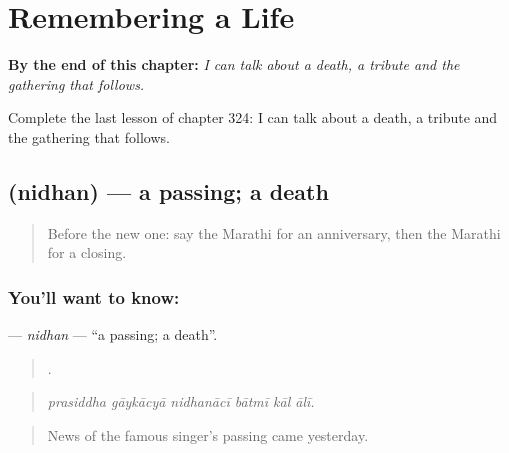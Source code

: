 
\chapter{Remembering a Life}
\label{ch:mr-remembering-a-life}

\begin{chapteropening}
\textbf{By the end of this chapter:} \emph{I can talk about a death, a tribute and the gathering that follows.}

Complete the last lesson of chapter 324: I can talk about a death, a tribute and the gathering that follows.
\end{chapteropening}

\section[\texorpdfstring{\mr{निधन} (nidhan)}{निधन (nidhan)}]{ (nidhan) — a passing; a death}

\label{lesson:MR-C324-nidhan}



\begin{quote}
Before the new one: say the Marathi for an anniversary, then the Marathi for a closing.
\end{quote}

\subsection*{You'll want to know: }
\textbf{} — \emph{nidhan} — \textquotedblleft{}a passing; a death\textquotedblright{}.

\begin{quote}
     .
\end{quote}

\begin{quote}
\emph{prasiddha gāykācyā nidhanācī bātmī kāl ālī.}
\end{quote}

\begin{quote}
News of the famous singer's passing came yesterday.
\end{quote}

